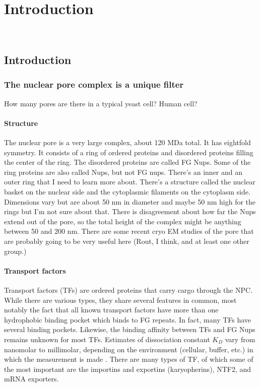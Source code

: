 \chapter{Introduction}~\label{ch01_introduction}

\section{Introduction}
\subsection{The nuclear pore complex is a unique filter}
How many pores are there in a typical yeast cell? Human cell?
\subsubsection{Structure}
The nuclear pore is a very large complex, about 120 MDa total.  It has eightfold symmetry.  It consists of a ring of ordered proteins and disordered proteins filling the center of the ring.  The disordered proteins are called FG Nups.  Some of the ring proteins are also called Nups, but not FG nups.  There's an inner and an outer ring that I need to learn more about.  There's a structure called the nuclear basket on the nuclear side and the cytoplasmic filaments on the cytoplasm side.  Dimensions vary but are about 50 nm in diameter and maybe 50 nm high for the rings but I'm not sure about that.  There is disagreement about how far the Nups extend out of the pore, so the total height of the complex might be anything between 50 and 200 nm.  There are some recent cryo EM studies of the pore that are probably going to be very useful here (Rout, I think, and at least one other group.)

\subsubsection{Transport factors}

Transport factors (TFs) are ordered proteins that carry cargo through the NPC.  While there are various types, they share several features in common, most notably the fact that all known transport factors have more than one hydrophobic binding pocket which binds to FG repeats.  In fact, many TFs have several binding pockets.  Likewise, the binding affinity between TFs and FG Nups remains unknown for most TFs.  Estimates of dissociation constant $K_D$ vary from nanomolar to millimolar, depending on the environment (cellular, buffer, etc.) in which the measurement is made \cite{things}. There are many types of TF, of which some of the most important are the importins and exportins (karyopherins), NTF2, and mRNA exporters.

